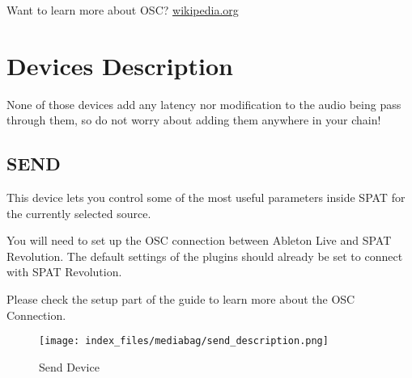 \documentclass[
  letterpaper,
  DIV=11,
  numbers=noendperiod]{scrreport}
\begin{document}
Want to learn more about OSC?
\href{https://en.wikipedia.org/wiki/Open_Sound_Control}{wikipedia.org}

\hypertarget{devices-description}{%
\section{Devices Description}\label{devices-description}}

None of those devices add any latency nor modification to the audio
being pass through them, so do not worry about adding them anywhere in
your chain!

\hypertarget{send}{%
\subsection{SEND}\label{send}}

This device lets you control some of the most useful parameters inside
SPAT for the currently selected source.

You will need to set up the OSC connection between Ableton Live and SPAT
Revolution. The default settings of the plugins should already be set to
connect with SPAT Revolution.

Please check the setup part of the guide to learn more about the OSC
Connection.

\begin{figure}

{\centering \texttt{[image: index\_files/mediabag/send\_description.png]}

}

\caption{Send Device}

\end{figure}
\end{document}
